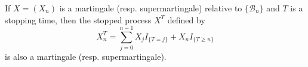 If $X = (X_n)$ is a martingale (resp. supermartingale) relative to $\{\mathcal{B}_n\}$ and $T$ is a stopping time, then the stopped process $X^T$ defined by
$$X_n^T = \sum_{j=0}^{n-1} X_j I_{\{T=j\}} + X_n I_{\{T \geq n\}}$$
is also a martingale (resp. supermartingale).
